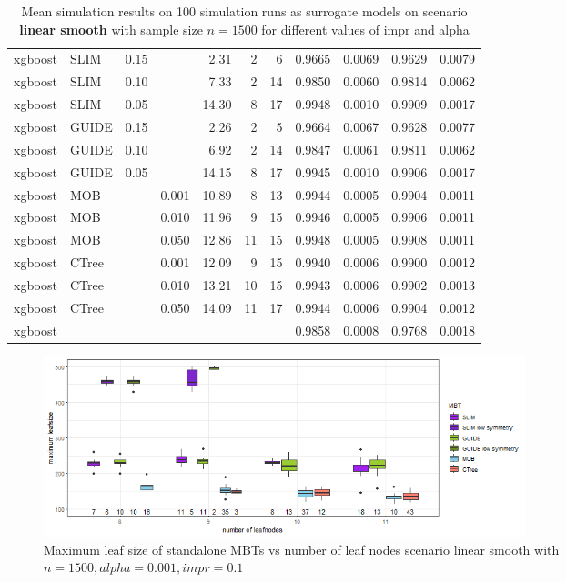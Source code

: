 \begin{table}[!htb]
\begin{tabular}[t]{l|l|r|r|r|r|r|r|r|r|r}
xgboost & SLIM & 0.15 & & 2.31 & 2 & 6 & 0.9665 & 0.0069 & 0.9629 & 0.0079\\
xgboost & SLIM & 0.10 & & 7.33 & 2 & 14 & 0.9850 & 0.0060 & 0.9814 & 0.0062\\
xgboost & SLIM & 0.05 & & 14.30 & 8 & 17 & 0.9948 & 0.0010 & 0.9909 & 0.0017\\
xgboost & GUIDE & 0.15 & & 2.26 & 2 & 5 & 0.9664 & 0.0067 & 0.9628 & 0.0077\\
xgboost & GUIDE & 0.10 & & 6.92 & 2 & 14 & 0.9847 & 0.0061 & 0.9811 & 0.0062\\
xgboost & GUIDE & 0.05 & & 14.15 & 8 & 17 & 0.9945 & 0.0010 & 0.9906 & 0.0017\\
xgboost & MOB & & 0.001 & 10.89 & 8 & 13 & 0.9944 & 0.0005 & 0.9904 & 0.0011\\
xgboost & MOB & & 0.010 & 11.96 & 9 & 15 & 0.9946 & 0.0005 & 0.9906 & 0.0011\\
xgboost & MOB & & 0.050 & 12.86 & 11 & 15 & 0.9948 & 0.0005 & 0.9908 & 0.0011\\
xgboost & CTree & & 0.001 & 12.09 & 9 & 15 & 0.9940 & 0.0006 & 0.9900 & 0.0012\\
xgboost & CTree & & 0.010 & 13.21 & 10 & 15 & 0.9943 & 0.0006 & 0.9902 & 0.0013\\
xgboost & CTree & & 0.050 & 14.09 & 11 & 17 & 0.9944 & 0.0006 & 0.9904 & 0.0012\\
\hline
xgboost &  & & &  &  &  & 0.9858 & 0.0008 & 0.9768 & 0.0018\\
\hline
\end{tabular}
\label{tab:app_linear_smooth_1000}
\caption{Mean simulation results on 100 simulation runs as surrogate models on scenario \textbf{linear smooth} with sample size $n = 1500$ for different values of impr and alpha}
\end{table}


\begin{figure}[!htb]
     \centering
    \includegraphics[width=14cm]{Figures/simulations/batchtools/basic_scenarios/linear_smooth/ls_1000_standalone_symmetrie.png}
    \caption{Maximum leaf size of standalone MBTs vs number of leaf nodes scenario linear smooth with $n=1500, alpha = 0.001, impr = 0.1$}
\label{fig:app_ls_1000_standalone_symmetrie}
\end{figure} 


